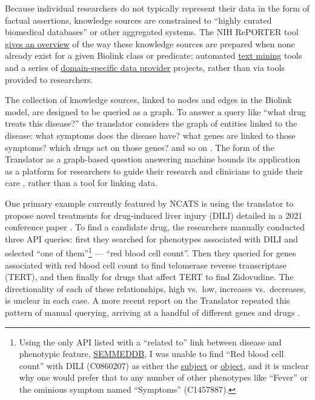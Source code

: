 Because individual researchers do not typically represent their data in
the form of factual assertions, knowledge sources are constrained to
``highly curated biomedical databases'' or other aggregated systems. The
NIH RePORTER tool
\href{https://reporter.nih.gov/search/DShVUhB_ZUq0X5UWFjy5WQ/projects?shared=true}{gives
an overview} of the way these knowledge sources are prepared when none
already exist for a given Biolink class or predicate: automated
\href{https://reporter.nih.gov/project-details/10548337}{text mining}
tools and a series of
\href{https://reporter.nih.gov/project-details/10056962}{domain-specific
data provider} projects, rather than via tools provided to researchers.

The collection of knowledge sources, linked to nodes and edges in the
Biolink model, are designed to be queried as a graph. To answer a query
like ``what drug treats this disease?'' the translator considers the
graph of entities linked to the disease: what symptoms does the disease
have? what genes are linked to those symptoms? which drugs act on those
genes? and so on \citep{renaissancecomputinginstituterenciBiomedicalDataTranslator2022} . The
form of the Translator as a graph-based question answering machine
bounds its application as a platform for researchers to guide their
research and clinicians to guide their care \citep{hailuNIHfundedProjectAims2019} , rather than a tool for linking data.

One primary example currently featured by NCATS is using the translator
to propose novel treatments for drug-induced liver injury (DILI) \citep{renaissancecomputinginstituterenciUseCasesShow2022}  detailed in
a 2021 conference paper \citep{goelExplanationContainerCaseBased2021} . To find a candidate drug, the researchers manually conducted three
API queries: first they searched for phenotypes associated with DILI and
selected ``one of them''\footnote{Using the only API listed with a
  ``related to'' link between disease and phenotypic feature,
  \href{https://smart-api.info/ui/1d288b3a3caf75d541ffaae3aab386c8}{SEMMEDDB},
  I was unable to find ``Red blood cell count'' with DILI (C0860207) as
  either the
  \href{https://biothings.ncats.io/semmeddb/query?q=subject.umls\%3AC0860207\&facet_size=10\&fetch_all=true\&_sorted=true\&format=json}{subject}
  or
  \href{https://biothings.ncats.io/semmeddb/query?q=object.umls\%3AC0860207\&facet_size=10\&fetch_all=true\&_sorted=true\&format=json}{object},
  and it is unclear why one would prefer that to any number of other
  phenotypes like ``Fever'' or the ominious symptom named ``Symptoms''
  (C1457887).} --- ``red blood cell count''. Then they queried for genes
associated with red blood cell count to find telomerase reverse
transcriptase (TERT), and then finally for drugs that affect TERT to
find Zidovudine. The directionality of each of these relationships, high
vs.~low, increases vs.~decreases, is unclear in each case. A more recent
report on the Translator repeated this pattern of manual querying,
arriving at a handful of different genes and drugs \citep{fechoProgressUniversalBiomedical2022} .

